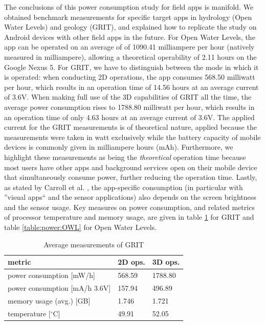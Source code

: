 \documentclass[review]{elsarticle}
\begin{document}
The conclusions of this power consumption study for field apps is manifold. We obtained benchmark measurements for specific target apps in hydrology (Open Water Levels) and geology (\gls{GRIT}), and explained how to replicate the study on Android devices with other field apps in the future. For Open Water Levels, the app can be operated on an average of of 1090.41 milliampere per hour (natively measured in milliampere), allowing a theoretical operability of 2.11 hours on the Google Nexus 5. For \gls{GRIT}, we have to distinguish between the mode in which it is operated: when conducting 2D operations, the app consumes 568.50 milliwatt per hour, which results in an operation time of 14.56 hours at an average current of 3.6V. When making full use of the 3D capabilities of \gls{GRIT} all the time, the average power consumption rises to 1788.80 milliwatt per hour, which results in an operation time of only 4.63 hours at an average current of 3.6V. The applied current for the GRIT measurements is of theoretical nature, applied because the measurements were taken in watt exclusively while the battery capacity of mobile devices is commonly given in milliampere hours (mAh). Furthermore, we highlight these measurements as being the \textit{theoretical} operation time because most users have other apps and background services open on their mobile device that simultaneously consume power, further reducing the operation time. Lastly, as stated by Carroll et al. \cite{Carroll2010}, the app-specific consumption (in particular with ''visual apps`` and the sensor applications) also depends on the screen brightness and the sensor usage. Key measures on power consumption, and related metrics of processor temperature and memory usage, are given in table \ref{table:power:GRIT} for \gls{GRIT} and table \ref{table:power:OWL} for Open Water Levels.

\begin{center}
\begin{longtable}[HT]{| l | p{2.5cm} | p{2.5cm} |}
	\caption{Average measurements of GRIT}
	\label{table:power:GRIT}
	\endhead
		\hline
		metric & 2D ops. & 3D ops. \\ \hline
		power consumption [mW/h] & 568.59 & 1788.80 \\ \hline
		power consumption [mA/h \@ 3.6V] & 157.94 & 496.89 \\ \hline
		memory usage (avg.) [GB] & 1.746 & 1.721 \\ \hline
		temperature [$^{\circ}$C] & 49.91 & 52.05 \\ \hline
\end{longtable}
\end{center}
\end{document}
